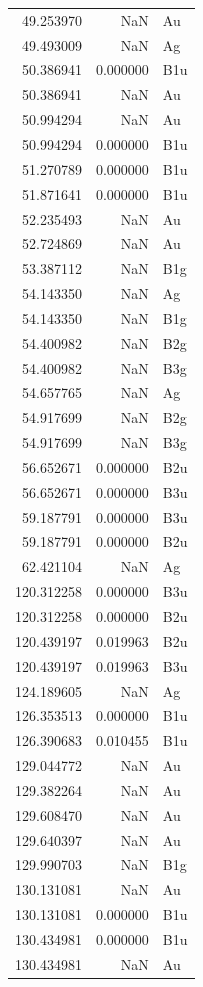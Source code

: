 \begin{longtable}{rrl}
49.253970 & NaN & Au \\
49.493009 & NaN & Ag \\
50.386941 & 0.000000 & B1u \\
50.386941 & NaN & Au \\
50.994294 & NaN & Au \\
50.994294 & 0.000000 & B1u \\
51.270789 & 0.000000 & B1u \\
51.871641 & 0.000000 & B1u \\
52.235493 & NaN & Au \\
52.724869 & NaN & Au \\
53.387112 & NaN & B1g \\
54.143350 & NaN & Ag \\
54.143350 & NaN & B1g \\
54.400982 & NaN & B2g \\
54.400982 & NaN & B3g \\
54.657765 & NaN & Ag \\
54.917699 & NaN & B2g \\
54.917699 & NaN & B3g \\
56.652671 & 0.000000 & B2u \\
56.652671 & 0.000000 & B3u \\
59.187791 & 0.000000 & B3u \\
59.187791 & 0.000000 & B2u \\
62.421104 & NaN & Ag \\
120.312258 & 0.000000 & B3u \\
120.312258 & 0.000000 & B2u \\
120.439197 & 0.019963 & B2u \\
120.439197 & 0.019963 & B3u \\
124.189605 & NaN & Ag \\
126.353513 & 0.000000 & B1u \\
126.390683 & 0.010455 & B1u \\
129.044772 & NaN & Au \\
129.382264 & NaN & Au \\
129.608470 & NaN & Au \\
129.640397 & NaN & Au \\
129.990703 & NaN & B1g \\
130.131081 & NaN & Au \\
130.131081 & 0.000000 & B1u \\
130.434981 & 0.000000 & B1u \\
130.434981 & NaN & Au \\

\end{longtable}

